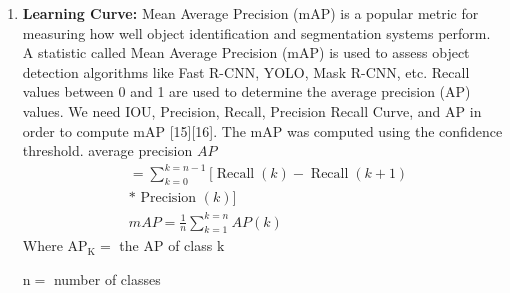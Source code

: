 \begin{enumerate}
    \item \textbf{Learning Curve:} Mean Average Precision (mAP) is a popular metric for measuring how well object identification and segmentation systems perform. A statistic called Mean Average Precision (mAP) is used to assess object detection algorithms like Fast R-CNN, YOLO, Mask R-CNN, etc. Recall values between 0 and 1 are used to determine the average precision (AP) values. We need IOU, Precision, Recall, Precision Recall Curve, and AP in order to compute mAP [15][16]. The mAP was computed using the confidence threshold. 
    average precision $A P$
        $$
        \begin{aligned}
        &=\sum_{k=0}^{k=n-1}[\operatorname{Recall}(k)-\operatorname{Recall}(k+1) \\
        &* \text { Precision }(k)] \\
        &m A P=\frac{1}{n} \sum_{k=1}^{k=n} A P(k)
        \end{aligned}
        $$
        Where $\mathrm{AP}_{\mathrm{K}}=$ the $\mathrm{AP}$ of class $\mathrm{k}$
        
        $\mathrm{n}=$ number of classes
\end{enumerate}